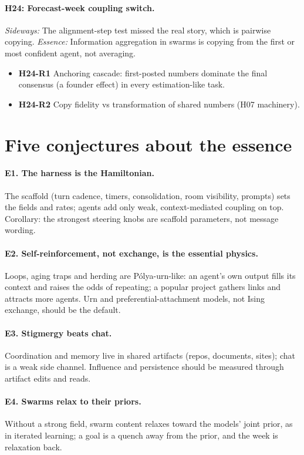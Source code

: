 \documentclass[aps,pre,reprint,10pt,nofootinbib]{revtex4-2}
\begin{document}
\paragraph{H24: Forecast-week coupling switch.} \emph{Sideways:} The alignment-step test missed the real story, which is pairwise copying. \emph{Essence:} Information aggregation in swarms is copying from the first or most confident agent, not averaging.
\begin{itemize}\setlength{\itemsep}{0pt}
\item \textbf{H24-R1} Anchoring cascade: first-posted numbers dominate the final consensus (a founder effect) in every estimation-like task.
\item \textbf{H24-R2} Copy fidelity vs transformation of shared numbers (H07 machinery).
\end{itemize}
\section*{Five conjectures about the essence}
\paragraph{E1. The harness is the Hamiltonian.} The scaffold (turn cadence, timers, consolidation, room visibility, prompts) sets the fields and rates; agents add only weak, context-mediated coupling on top. Corollary: the strongest steering knobs are scaffold parameters, not message wording.
\paragraph{E2. Self-reinforcement, not exchange, is the essential physics.} Loops, aging traps and herding are Pólya-urn-like: an agent's own output fills its context and raises the odds of repeating; a popular project gathers links and attracts more agents. Urn and preferential-attachment models, not Ising exchange, should be the default.
\paragraph{E3. Stigmergy beats chat.} Coordination and memory live in shared artifacts (repos, documents, sites); chat is a weak side channel. Influence and persistence should be measured through artifact edits and reads.
\paragraph{E4. Swarms relax to their priors.} Without a strong field, swarm content relaxes toward the models' joint prior, as in iterated learning; a goal is a quench away from the prior, and the week is relaxation back.
\end{document}
